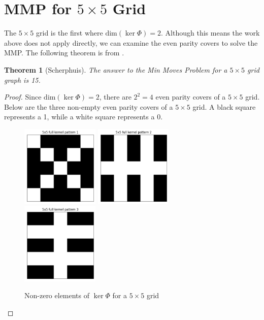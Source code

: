\documentclass[a4paper]{article}
\newtheorem{theorem}{Theorem}
\renewcommand{\dim}[1]{\text{dim}\left( #1 \right)}
\begin{document}
	\section{MMP for $5 \times 5$ Grid}
	The $5 \times 5$ grid is the first where $\dim{\ker{\Phi}} = 2$.
	Although this means the work above does not apply directly, we can examine the even parity covers to solve the MMP.
	The following theorem is from \cite{jaap}.
	\begin{theorem}[Scherphuis]\label{min-moves-problem-5x5}
		The answer to the Min Moves Problem for a $5 \times 5$ grid graph is 15.
	\end{theorem}
	\begin{proof}
		Since $\dim{\ker{\Phi}} = 2$, there are $2^2 = 4$ even parity covers of a $5 \times 5$ grid.
		Below are the three non-empty even parity covers of a $5 \times 5$ grid.
		A black square represents a 1, while a white square represents a 0.
		
		\begin{figure}[H]
			\centering
			\includegraphics[width=0.33\textwidth]{../../code/serialization/kernels/5x5/full/5x5_kernel_full_1.png}
			\includegraphics[width=0.33\textwidth]{../../code/serialization/kernels/5x5/full/5x5_kernel_full_2.png}
			\includegraphics[width=0.33\textwidth]{../../code/serialization/kernels/5x5/full/5x5_kernel_full_3.png}
			\caption{Non-zero elements of $\ker{\Phi}$ for a $5 \times 5$ grid}
		\end{figure}
	

\end{proof}
\end{document}

